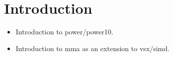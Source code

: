 \documentclass[\main/thesis.tex]{subfiles}
\begin{document}
\chapter{Introduction}

\begin{itemize}
  \item Introduction to \gls{power}/\gls{power10}.
  \item Introduction to \gls{mma} as an extension to \gls{vsx}/\gls{simd}.
\end{itemize}
\end{document}
